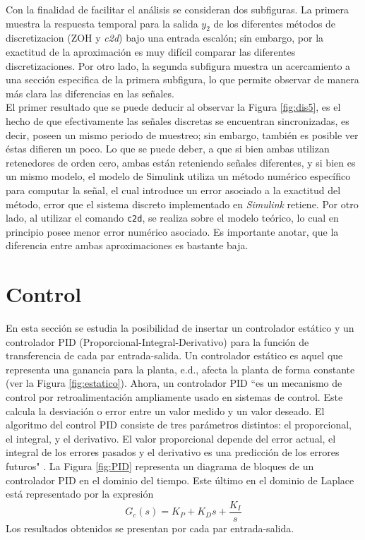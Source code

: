 \documentclass[journal]{IEEEtran}
\begin{document}
Con la  finalidad de facilitar el análisis se consideran dos subfiguras. La primera muestra la respuesta temporal para la salida $y_2$ de los diferentes métodos de discretizacion (ZOH y \textit{c2d}) bajo una entrada escalón; sin embargo, por la exactitud de la aproximación es muy difícil comparar las diferentes discretizaciones. Por otro lado, la segunda subfigura muestra un acercamiento a una sección especifica de la primera subfigura, lo que permite observar de manera más clara las diferencias en las señales.\\ 

El primer resultado que se puede deducir al observar la Figura \ref{fig:dis5}, es el hecho de que efectivamente las señales discretas se encuentran sincronizadas, es decir, poseen un mismo periodo de muestreo; sin embargo, también es posible ver éstas difieren un poco. Lo que se puede deber, a que si bien ambas utilizan retenedores de orden cero, ambas están reteniendo señales diferentes, y si bien es un mismo modelo, el modelo de Simulink utiliza un método numérico específico para computar la señal, el cual introduce un error asociado a la exactitud del método, error que el sistema discreto implementado en \textit{Simulink} retiene. Por otro lado, al utilizar el comando \texttt{c2d}, se realiza sobre el modelo teórico, lo cual en principio posee menor error numérico asociado. Es importante anotar, que la diferencia entre ambas aproximaciones es bastante baja.


\section{Control}
En esta sección se estudia la posibilidad de insertar un controlador estático y un controlador PID (Proporcional-Integral-Derivativo) para la función de transferencia de cada par entrada-salida. Un controlador estático es aquel que representa una ganancia para la planta, e.d., afecta la planta de forma constante (ver la Figura \ref{fig:estatico}). Ahora, un controlador PID ``es un mecanismo de control por retroalimentación ampliamente usado en sistemas de control. Este calcula la desviación o error entre un valor medido y un valor deseado. El algoritmo del control PID consiste de tres parámetros distintos: el proporcional, el integral, y el derivativo. El valor proporcional depende del error actual, el integral de los errores pasados y el derivativo es una predicción de los errores futuros" \cite{wiki:PID}. La Figura \ref{fig:PID} representa un diagrama de bloques de un controlador PID en el dominio del tiempo. Este último en el dominio de Laplace está representado por la expresión
\begin{equation}
\label{eq:PID}
G_c(s) = K_P+K_Ds+\dfrac{K_I}{s}
\end{equation}
Los resultados obtenidos se presentan por cada par entrada-salida.\\
\end{document}
